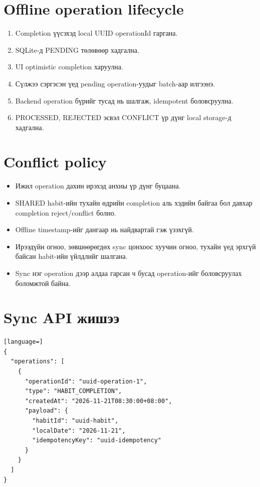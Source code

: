 \documentclass[12pt,a4paper,oneside]{report}
\begin{document}
\section{Offline operation lifecycle}
\begin{enumerate}
  \item Completion үүсэхэд local UUID operationId гаргана.
  \item SQLite-д PENDING төлөвөөр хадгална.
  \item UI optimistic completion харуулна.
  \item Сүлжээ сэргэсэн үед pending operation-уудыг batch-аар илгээнэ.
  \item Backend operation бүрийг тусад нь шалгаж, idempotent боловсруулна.
  \item PROCESSED, REJECTED эсвэл CONFLICT үр дүнг local storage-д хадгална.
\end{enumerate}

\section{Conflict policy}
\begin{itemize}
  \item Ижил operation дахин ирэхэд анхны үр дүнг буцаана.
  \item SHARED habit-ийн тухайн өдрийн completion аль хэдийн байгаа бол давхар completion reject/conflict болно.
  \item Offline timestamp-ийг дангаар нь найдвартай гэж үзэхгүй.
  \item Ирээдүйн огноо, зөвшөөрөгдөх sync цонхоос хуучин огноо, тухайн үед эрхгүй байсан habit-ийн үйлдлийг шалгана.
  \item Sync нэг operation дээр алдаа гарсан ч бусад operation-ийг боловсруулах боломжтой байна.
\end{itemize}

\section{Sync API жишээ}
\begin{lstlisting}[language=]
{
  "operations": [
    {
      "operationId": "uuid-operation-1",
      "type": "HABIT_COMPLETION",
      "createdAt": "2026-11-21T08:30:00+08:00",
      "payload": {
        "habitId": "uuid-habit",
        "localDate": "2026-11-21",
        "idempotencyKey": "uuid-idempotency"
      }
    }
  ]
}
\end{lstlisting}
\end{document}
